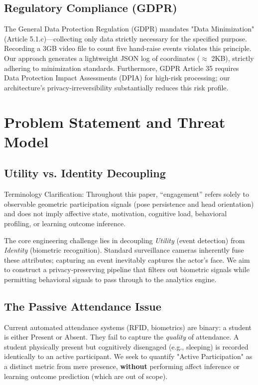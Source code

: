 \documentclass[conference]{IEEEtran}
\begin{document}
\subsection{Regulatory Compliance (GDPR)}
The General Data Protection Regulation (GDPR) \cite{b16} mandates "Data Minimization" (Article 5.1.c)—collecting only data strictly necessary for the specified purpose. Recording a 3GB video file to count five hand-raise events violates this principle. Our approach generates a lightweight JSON log of coordinates ($\approx$ 2KB), strictly adhering to minimization standards. Furthermore, GDPR Article 35 requires Data Protection Impact Assessments (DPIA) for high-risk processing; our architecture's privacy-irreversibility substantially reduces this risk profile.

\section{Problem Statement and Threat Model}

\subsection{Utility vs. Identity Decoupling}
Terminology Clarification: Throughout this paper, ``engagement'' refers solely to observable geometric participation signals (pose persistence and head orientation) and does not imply affective state, motivation, cognitive load, behavioral profiling, or learning outcome inference.

The core engineering challenge lies in decoupling \textit{Utility} (event detection) from \textit{Identity} (biometric recognition). Standard surveillance cameras inherently fuse these attributes; capturing an event inevitably captures the actor's face. We aim to construct a privacy-preserving pipeline that filters out biometric signals while permitting behavioral signals to pass through to the analytics engine.

\subsection{The Passive Attendance Issue}
Current automated attendance systems (RFID, biometrics) are binary: a student is either Present or Absent. They fail to capture the \textit{quality} of attendance. A student physically present but cognitively disengaged (e.g., sleeping) is recorded identically to an active participant. We seek to quantify "Active Participation" as a distinct metric from mere presence, \textbf{without} performing affect inference or learning outcome prediction (which are out of scope).
\end{document}
